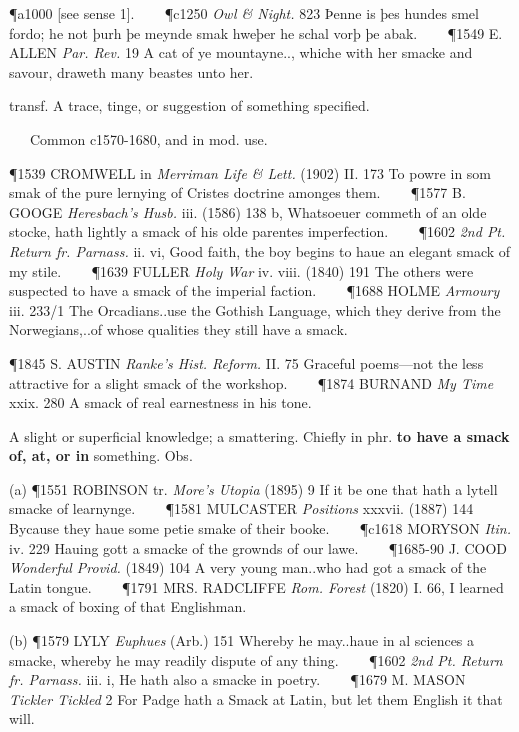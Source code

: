 \begin{description}[wide, labelwidth=!, labelindent=0pt]
\begin{myenumerate}
\P a1000 [see sense 1].    
\P c1250  \textit{Owl \& Night.} 823 Þenne is þes hundes smel fordo; he not þurh þe meynde smak hweþer he schal vorþ þe abak.    
\P 1549 E. ALLEN  \textit{Par. Rev.} 19 A cat of ye mountayne.., whiche with her smacke and savour, draweth many beastes unto her.

 transf. A trace, tinge, or suggestion of something specified.

   Common c1570-1680, and in mod. use.

\P 1539 CROMWELL in  \textit{Merriman Life \& Lett.} (1902) II. 173 To powre in som smak of the pure lernying of Cristes doctrine amonges them.    
\P 1577 B. GOOGE  \textit{Heresbach's Husb.} iii. (1586) 138 b, Whatsoeuer commeth of an olde stocke, hath lightly a smack of his olde parentes imperfection.    
\P 1602 \textit{2nd  Pt. Return fr. Parnass.} ii. vi, Good faith, the boy begins to haue an elegant smack of my stile.    
\P 1639 FULLER  \textit{Holy War} iv. viii. (1840) 191 The others were suspected to have a smack of the imperial faction.    
\P 1688 HOLME  \textit{Armoury} iii. 233/1 The Orcadians..use the Gothish Language, which they derive from the Norwegians,..of whose qualities they still have a smack.

\P 1845 S. AUSTIN  \textit{Ranke's Hist. Reform.} II. 75 Graceful poems—not the less attractive for a slight smack of the workshop.    
\P 1874 BURNAND  \textit{My Time} xxix. 280 A smack of real earnestness in his tone.

 A slight or superficial knowledge; a smattering. Chiefly in phr. \textbf{to have a smack of, at, or in} something. Obs.

(a) \P 1551 ROBINSON tr.  \textit{More's Utopia} (1895) 9 If it be one that hath a lytell smacke of learnynge.    
\P 1581 MULCASTER  \textit{Positions} xxxvii. (1887) 144 Bycause they haue some petie smake of their booke.    
\P c1618 MORYSON  \textit{Itin.} iv. 229 Hauing gott a smacke of the grownds of our lawe.    
\P 1685-90 J. COOD  \textit{Wonderful Provid.} (1849) 104 A very young man..who had got a smack of the Latin tongue.    
\P 1791 MRS. RADCLIFFE  \textit{Rom. Forest} (1820) I. 66, I learned a smack of boxing of that Englishman.

(b) \P 1579 LYLY  \textit{Euphues} (Arb.) 151 Whereby he may..haue in al sciences a smacke, whereby he may readily dispute of any thing.    
\P 1602 \textit{2nd  Pt. Return fr. Parnass.} iii. i, He hath also a smacke in poetry.    
\P 1679 M. MASON  \textit{Tickler Tickled} 2 For Padge hath a Smack at Latin, but let them English it that will.


\end{myenumerate}
\end{description}
